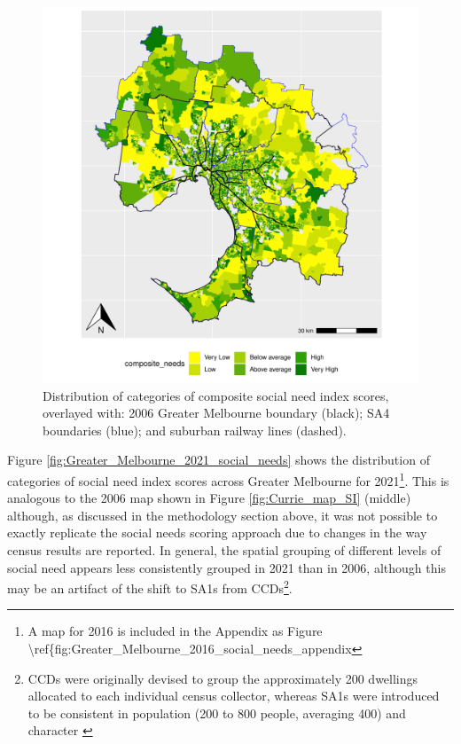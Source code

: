 \documentclass[preprint, 3p,
authoryear]{elsarticle} %
\begin{document}
\begin{figure}
\centering
\includegraphics{ReynoldsCurrieQu2024_files/figure-latex/Greater_Melbourne_2021_social_needs-1.pdf}
\caption{Distribution of categories of composite social need index
scores, overlayed with: 2006 Greater Melbourne boundary (black); SA4
boundaries (blue); and suburban railway lines (dashed).}
\end{figure}

Figure \ref{fig:Greater_Melbourne_2021_social_needs} shows the
distribution of categories of social need index scores across Greater
Melbourne for 2021\footnote{A map for 2016 is included in the Appendix
  as Figure
  \textbackslash ref\{fig:Greater\_Melbourne\_2016\_social\_needs\_appendix}.
This is analogous to the 2006 map shown in Figure
\ref{fig:Currie_map_SI} (middle) although, as discussed in the
methodology section above, it was not possible to exactly replicate the
\citet{currie2010identifying} social needs scoring approach due to
changes in the way census results are reported. In general, the spatial
grouping of different levels of social need appears less consistently
grouped in 2021 than in 2006, although this may be an artifact of the
shift to SA1s from CCDs\footnote{CCDs were originally devised to group
  the approximately 200 dwellings allocated to each individual census
  collector, whereas SA1s were introduced to be consistent in population
  (200 to 800 people, averaging 400) and character \citep{ABS_SA1s_CCDs}}.
\end{document}
